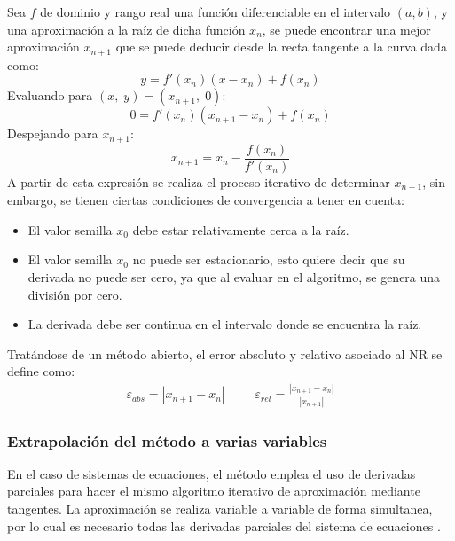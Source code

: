 \documentclass[12pt]{article}
\begin{document}
Sea $f$ de dominio y rango real una función diferenciable en el intervalo $(a,b)$, y una aproximación a la raíz de dicha función $x_n$, se puede encontrar una mejor aproximación $x_{n+1}$ que se puede deducir desde la recta tangente a la curva dada como:
\begin{equation*}
    y=f'(x_n)(x-x_n)+f(x_n)
    \label{recta tangente en x_n}
\end{equation*}
Evaluando para $(x,\;y)=(x_{n+1},\;0)$:
\begin{equation*}
    0=f'(x_n)(x_{n+1}-x_n)+f(x_n)
    \label{recta tangente en x_n+1}
\end{equation*}
Despejando para $x_{n+1}$:
\begin{equation*}
    x_{n+1}=x_n-\frac{f(x_n)}{f'(x_n)}
    \label{newton raphson 1var}
\end{equation*}
A partir de esta expresión se realiza el proceso iterativo de determinar $x_{n+1}$, sin embargo, se tienen ciertas condiciones de convergencia a tener en cuenta:
\begin{itemize}
    \item El valor semilla $x_0$ debe estar relativamente cerca a la raíz.
    \item El valor semilla $x_0$ no puede ser estacionario, esto quiere decir que su derivada no puede ser cero, ya que al evaluar en el algoritmo, se genera una división por cero.
    \item La derivada debe ser continua en el intervalo donde se encuentra la raíz.
\end{itemize}
Tratándose de un método abierto, el error absoluto y relativo asociado al NR se define como:
\begin{align}
    \varepsilon_{abs}=|x_{n+1}-x_n|&&&\varepsilon_{rel}=\frac{|x_{n+1}-x_n|}{|x_{n+1}|}
\end{align}
\subsubsection{Extrapolación del método a varias variables}
En el caso de sistemas de ecuaciones, el método emplea el uso de derivadas parciales para hacer el mismo algoritmo iterativo de aproximación mediante tangentes. La aproximación se realiza variable a variable de forma simultanea, por lo cual es necesario todas las derivadas parciales del sistema de ecuaciones \cite{mathews}. 
\end{document}
